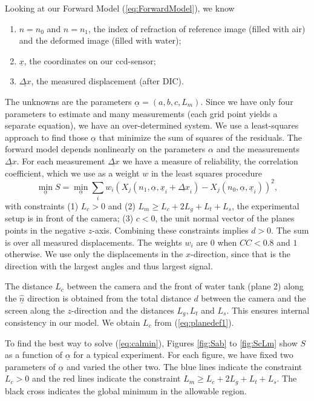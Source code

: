 \documentclass{article}
\begin{document}
Looking at our Forward Model (\ref{eq:ForwardModel}), we know
\begin{enumerate}
	\item $n=n_0$ and $n=n_1$, the index of refraction of reference image (filled with air) and the deformed image (filled with water); 
	\item $\underline{x}$, the coordinates on our ccd-sensor; 
	\item $\underline{\Delta x}$, the measured displacement (after DIC). 
\end{enumerate}
The unknowns are the parameters $\underline{\alpha} = (a, b, c, L_m)$. Since we have only four parameters to estimate and many measurements (each grid point yields a separate equation), we have an over-determined system. We use a least-squares approach to find those $\underline{\alpha}$ that minimize the sum of squares of the residuals. The forward model depends nonlinearly on the parameters $\alpha$ and the measurements $\underline{\Delta x}$. For each measurement $\underline{\Delta x}$ we have a measure of reliability, the correlation coefficient, which we use as a weight $w$ in the least squares procedure
\begin{equation}
\label{eq:calmin} 
\min_{\underline{\alpha}}  S = \min_{\underline{\alpha}} \sum_i w_i \left(X_{j}(n_1, \underline{\alpha}, \underline{x}_i+\underline{\Delta x}_i) - X_{j}(n_0, \underline{\alpha}, \underline{x}_i)\right)^2, 
\end{equation}
with constraints (1) $L_c > 0$ and (2) $L_m \geq L_c + 2 L_g + L_t + L_s$, the experimental setup is in front of the camera; (3) $c < 0$, the unit normal vector of the planes points in the negative $z$-axis. Combining these constraints implies $d>0$. The sum is over all measured displacements. The weights $w_i$ are $0$ when $CC < 0.8$ and $1$ otherwise. We use only the displacements in the $x$-direction, since that is the direction with the largest angles and thus largest signal.

The distance $L_c$ between the camera and the front of water tank (plane 2) along the $\underline{\hat{n}}$ direction is obtained from the total distance $d$ between the camera and the screen along the $z$-direction and the distances $L_g, L_t$ and $L_s$. This ensures internal consistency in our model. We obtain $L_c$ from (\ref{eq:planedef1}).

To find the best way to solve (\ref{eq:calmin}), Figures \ref{fig:Sab} to \ref{fig:ScLm} show $S$ as a function of $\underline{\alpha}$ for a typical experiment. For each figure, we have fixed two parameters of $\underline{\alpha}$ and varied the other two. The blue lines indicate the constraint $L_c >0$ and the red lines indicate the constraint $L_m \geq L_c + 2 L_g + L_t + L_s$. The black cross indicates the global minimum in the allowable region.
\end{document}
